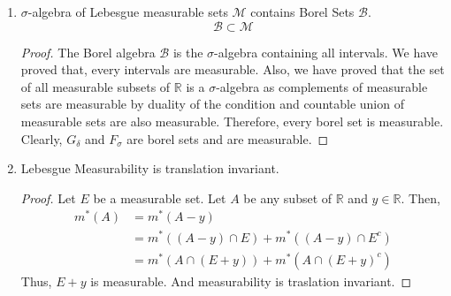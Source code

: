 \begin{enumerate}
\begin{proof}
	Clearly, $m^\ast(A_1) \le \sum_{k=1}^\infty l(I_k')$ and $m^\ast(A_2) \le \sum_{k=1}^\infty l(I_k'')$.
	\begin{align*}
		m^\ast(A_1)+m^\ast(A_2) & \le \sum_{k=1}^\infty l(I_k') + \sum_{k=1}^\infty l(I_k'') \\
		& \le \sum_{k=1}^\infty l(I_k') + l(I_k'') \\
		& \le \sum_{k=1}^\infty l(I_k) \le m^\ast(A)
	\end{align*}
		Thus, $(a,\infty)$ is measurable. Therefore, every interval is measurable.
	\end{proof}
	\item $\sigma$-algebra of Lebesgue measurable sets $\mathcal{M}$ contains Borel Sets $\mathcal{B}$.
	\begin{equation}
		\mathcal{B} \subset \mathcal{M}
	\end{equation}
	\begin{proof}
	The Borel algebra $\mathcal{B}$ is the $\sigma$-algebra containing all intervals. We have proved that, every intervals are measurable. Also, we have proved that the set of all measurable subsets of $\mathbb{R}$ is a $\sigma$-algebra as complements of measurable sets are measurable by duality of the condition and countable union of measurable sets are also measurable. Therefore, every borel set is measurable. Clearly, $G_\delta$ and $F_\sigma$ are borel sets and are measurable.
	\end{proof}
	\item Lebesgue Measurability is translation invariant.
	\begin{proof}
		Let $E$ be a measurable set. Let $A$ be any subset of $\mathbb{R}$ and $y \in \mathbb{R}$. Then,
	\begin{align*}
		m^\ast(A) & = m^\ast(A-y)\\
		& = m^\ast((A-y) \cap E) + m^\ast((A-y) \cap E^c)\\
		& = m^\ast(A \cap (E+y)) + m^\ast(A \cap (E+y)^c)
	\end{align*}
		Thus, $E+y$ is measurable. And measurability is traslation invariant.
	\end{proof}
\end{enumerate}

